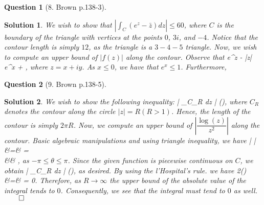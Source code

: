 \documentclass{article} %
\def\eQb#1\eQe{\begin{eqnarray*}#1\end{eqnarray*}}
\theoremstyle{quest}
\newtheorem*{question}{Question}
\newtheorem*{solution}{Solution}
\begin{document}
\bigskip

\begin{question}[8. Brown p.138-3]
\end{question}
\begin{solution}
We wish to show that $\left| \int_{C} (e^z - \bar{z}) dz \right| \leq 60$, where $C$ is the
boundary of the triangle with vertices at the points $0$, $3i$, and $-4$. Notice that
the contour length is simply $12$, as the triangle is a $3-4-5$ triangle. Now, we wish to 
compute an upper bound of $|f(z)|$ along the contour. Observe that
\eQb
|e^z - \bar{z}| \leq e^x + , 
\eQe  
where $z = x + iy$. As $x \leq 0$, we have that $e^x \leq 1$. Furthermore, 
\end{solution}

\bigskip

\begin{question}[9. Brown p.138-5]
\end{question}
\begin{solution}
We wish to show the following inequality:
\eQb
\left| \int_{C_R}  dz \right| \pi(),
\eQe
where $C_R$ denotes the contour along the circle $|z| = R (R>1)$. Hence, the length of the contour
is simply $2\pi R$. Now, we compute an upper bound of $\left| \dfrac{\log(z)}{z^2} \right|$ along
the contour. Basic algebraic manipulations and using triangle inequality, we have
\eQb
\left|  \right| &=&  =  \\
&\leq&  \leq {}, 
\eQe 
as $-\pi \leq \theta \leq \pi$. Since the given function is piecewise continuous on $C$, we obtain 
\eQb
\left| \int_{C_R}  dz \right| \pi(),
\eQe
as desired. By using the l'Hospital's rule. we have
\eQb
\underset{R \to \infty}{\lim} 2\pi() &=& 
  = 0.
\eQe
Therefore, as $R \to \infty$ the upper bound of the absolute value of the integral tends to $0$.
Consequently, we see that the integral must tend to $0$ as well. $\qed$
\end{solution}

\bigskip
\end{document}
